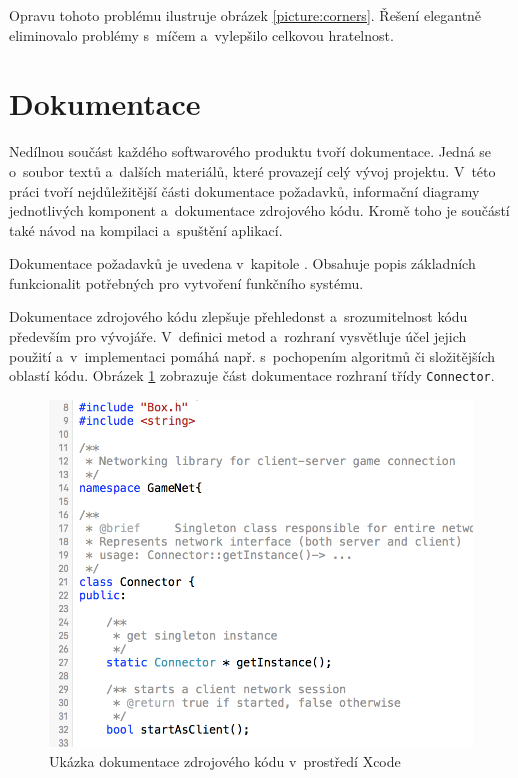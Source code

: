 \documentclass[thesis=B,czech,hidelinks]{FITthesis}[2012/06/26] %
\newcommand{\code}[1]{\texttt{#1}}
\begin{document}
Opravu tohoto problému ilustruje obrázek \ref{picture:corners}. Řešení elegantně eliminovalo problémy s~míčem a~vylepšilo celkovou hratelnost.

\section{Dokumentace}

Nedílnou součást každého softwarového produktu tvoří dokumentace. Jedná se o~soubor textů a~dalších materiálů, které provazejí celý vývoj projektu. V~této práci tvoří nejdůležitější části dokumentace požadavků, informační diagramy jednotlivých komponent a~dokumentace zdrojového kódu. Kromě toho je součástí také návod na kompilaci a~spuštění aplikací.

Dokumentace požadavků je uvedena v~kapitole \label{section:requirements}. Obsahuje popis základních funkcionalit potřebných pro vytvoření funkčního systému.

Dokumentace zdrojového kódu zlepšuje přehledonst a~srozumitelnost kódu především pro vývojáře. V~definici metod a~rozhraní vysvětluje účel jejich použití a~v~implementaci pomáhá např. s~pochopením algoritmů či složitějších oblastí kódu. Obrázek \ref{picture:source_documentation} zobrazuje část dokumentace rozhraní třídy \code{Connector}. 

\begin{figure}[h]
\includegraphics[width=\textwidth]{source_docs}
\caption{Ukázka dokumentace zdrojového kódu v~prostředí Xcode}
\label{picture:source_documentation}
\end{figure}
\end{document}
